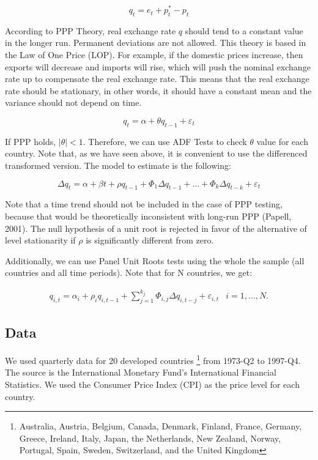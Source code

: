 \documentclass[]{article}
\begin{document}
\[q_{t} = e_{t} + p^*_{t} - p_{t}\]

According to PPP Theory, real exchange rate \(q\) should tend to a constant value in the longer run. Permanent deviations are not allowed. This theory is based in the Law of One Price (LOP). For example, if the domestic prices increase, then exports will decrease and imports will rise, which will push the nominal exchange rate up to compensate the real exchange rate. This means that the real exchange rate should be stationary, in other words, it should have a constant mean and the variance should not depend on time.

\[q_{t} = \alpha + \theta q_{t-1} + \varepsilon_{t}\]

If PPP holds, \(|\theta| < 1\). Therefore, we can use ADF Tests to check \(\theta\) value for each country. Note that, as we have seen above, it is convenient to use the differenced transformed version. The model to estimate is the following:

\[\Delta q_{t} = \alpha + \beta t + \rho q_{t-1} + \varPhi_1\Delta q_{t-1} + \dots + \varPhi_k\Delta q_{t-k} + \varepsilon_{t}\]

Note that a time trend should not be included in the case of PPP testing, because that would be theoretically inconsistent with long-run PPP (Papell, 2001). The null hypothesis of a unit root is rejected in favor of the alternative of level stationarity if \(\rho\) is significantly different from zero.

Additionally, we can use Panel Unit Roots tests using the whole the sample (all countries and all time periods). Note that for N countries, we get:

\begin{eqnarray*}
    q_{i,t} =\alpha_{i} + \rho_{i}q_{i, t-1} + \sum_{j=1}^{k_{j}}\Phi_{i,j}\Delta q_{i, t-j} + \varepsilon_{i,t}  & i = 1, \dots, N. 
\end{eqnarray*}

\hypertarget{data}{%
\subsection{Data}\label{data}}

We used quarterly data for 20 developed countries \footnote{Australia, Austria, Belgium, Canada, Denmark, Finland, France, Germany, Greece, Ireland, Italy, Japan, the Netherlands, New Zealand, Norway, Portugal, Spain, Sweden, Switzerland, and the United Kingdom} from 1973-Q2 to 1997-Q4. The source is the International Monetary Fund's International Financial Statistics. We used the Consumer Price Index (CPI) as the price level for each country.
\end{document}
